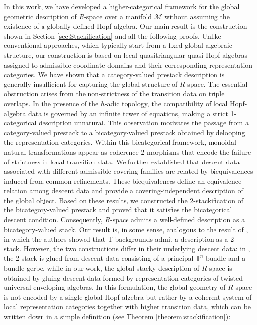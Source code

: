 \documentclass[reqno]{amsart}
\theoremstyle{definition}
\theoremstyle{remark}
\begin{document}
In this work, we have developed a higher-categorical framework for the global geometric description of $R$-space over a manifold $\mathcal{M}$ without assuming the existence of a globally defined Hopf algebra. Our main result is the construction shown in Section \ref{sec:Stackification} and all the following proofs. Unlike conventional approaches, which typically start from a fixed global algebraic structure, our construction is based on local quasitriangular quasi-Hopf algebras assigned to admissible coordinate domains and their corresponding representation categories. We have shown that a category-valued prestack description is generally insufficient for capturing the global structure of $R$-space. The essential obstruction arises from the non-strictness of the transition data on triple overlaps. In the presence of the $\hbar$-adic topology, the compatibility of local Hopf-algebra data is governed by an infinite tower of equations, making a strict 1-categorical description unnatural. This observation motivates the passage from a category-valued prestack to a bicategory-valued prestack obtained by delooping the representation categories. Within this bicategorical framework, monoidal natural transformations appear as coherence 2-morphisms that encode the failure of strictness in local transition data. We further established that descent data associated with different admissible covering families are related by biequivalences induced from common refinements. These biequivalences define an equivalence relation among descent data and provide a covering-independent description of the global object. Based on these results, we constructed the 2-stackification of the bicategory-valued prestack and proved that it satisfies the bicategorical descent condition. Consequently, $R$-space admits a well-defined description as a bicategory-valued stack. Our result is, in some sense, analogous to the result of \cite{nikolaus2020higher}, in which the authors showed that T-backgrounds admit a description as a 2-stack. However, the two constructions differ in their underlying descent data: in \cite{nikolaus2020higher}, the 2-stack is glued from descent data consisting of a principal $\mathbb{T}^n$-bundle and a bundle gerbe, while in our work, the global stacky description of $R$-space is obtained by gluing descent data formed by representation categories of twisted universal enveloping algebras. In this formulation, the global geometry of $R$-space is not encoded by a single global Hopf algebra but rather by a coherent system of local representation categories together with higher transition data, which can be written down in a simple definition (see Theorem \ref{theorem:stackification}):
\end{document}
